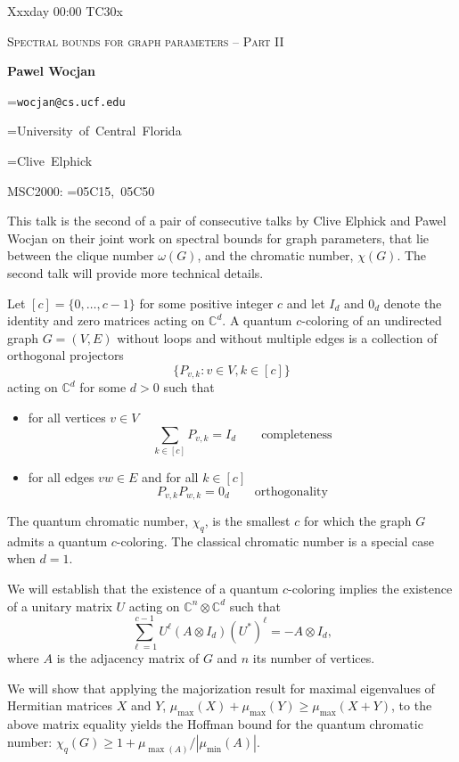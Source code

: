 \documentclass[12pt,a4paper]{article}
\makeatletter
\newcommand{\TalkTimeLocation}{Xxxday 00:00 TC30x}
\newcommand{\ifEmpty}[3]{\setbox0=\hbox{#1\unskip}\ifdim\wd0=0pt{#2}\else{#3}\fi}
\newcommand{\nothingIfEmpty}[2]{\ifEmpty{#1}{}{#2}}
\newcommand{\showIfNotEmpty}[1]{\nothingIfEmpty{#1}{#1}}
\newcommand{\showTalkJointWork}[1]{\nothingIfEmpty{#1}{(This talk is based on joint work with #1.)}}
\newcommand{\warn}[1]{\color{red}\large\textbf{\textsf{#1}}}
\newcommand{\TalkTitle}{Spectral bounds for graph parameters -- Part II} %
\newcommand{\TalkPresenter}{Pawel Wocjan} %
\newcommand{\TalkEmail}{wocjan@cs.ucf.edu} %
\newcommand{\TalkAffiliation}{University of Central Florida} %
\newcommand{\TalkJointWork}{Clive Elphick} %
\newcommand{\TalkMSCCodes}{05C15, 05C50} %
\newcommand{\C}{\mathbb{C}}
\makeatother
\begin{document}
\hfill \textsf{\TalkTimeLocation}
\begin{center}
 {\Large\textsc{\TalkTitle}}

 \textbf{\TalkPresenter}

 \showIfNotEmpty{\texttt{\TalkEmail}}

 \showIfNotEmpty{\TalkAffiliation}

 \showTalkJointWork{\TalkJointWork}

 {\small{MSC2000: \ifEmpty{\TalkMSCCodes}{\warn{An MSC code is required!}}{\TalkMSCCodes}}}

 \bigskip\bigskip
\end{center}


This talk is the second of a pair of consecutive talks by Clive Elphick and Pawel Wocjan on their joint work on spectral bounds for graph parameters, that lie between the clique number $\omega(G)$, and the chromatic number, $\chi(G)$. The second talk will provide more technical details. 

Let $[c]=\{0,\ldots,c-1\}$ for some positive integer $c$ and let $I_d$ and $0_d$ denote the identity and zero matrices acting on $\C^d$. 
A quantum $c$-coloring of an undirected graph $G=(V,E)$ without loops and without multiple edges is a collection of orthogonal projectors 
\[
\{ P_{v,k} : v \in V, k \in [c] \}
\]
acting on $\C^d$ for some $d>0$ such that
\begin{itemize}
\item for all vertices $v\in V$
\[
\sum_{k\in [c]} P_{v,k} = I_d \quad \quad \mbox{completeness}
\]
\item for all edges $vw\in E$ and for all $k\in [c]$
\[
P_{v,k} P_{w,k} = 0_d \quad \quad \mbox{orthogonality}
\]
\end{itemize}
The quantum chromatic number, $\chi_q$, is the smallest $c$ for which the graph $G$ admits a quantum $c$-coloring. The classical chromatic number is a special case when $d=1$.

We will establish that the existence of a quantum $c$-coloring implies the existence of a unitary matrix $U$ acting on $\C^n \otimes \C^d$ such that
\[
\sum_{\ell=1}^{c-1} U^\ell (A\otimes I_d) (U^*)^\ell = -A \otimes I_d,
\]
where $A$ is the adjacency matrix of $G$ and $n$ its number of vertices.  

We will show that applying the majorization result for maximal eigenvalues of Hermitian matrices $X$ and $Y$, 
$\mu_{\max}(X) + \mu_{\max}(Y) \ge \mu_{\max}(X+Y)$, to the above matrix equality yields the Hoffman bound for the quantum chromatic number: $\chi_q(G) \ge 1 + \mu_{\max(A)}/|\mu_{\min}(A)|$.
\end{document}
